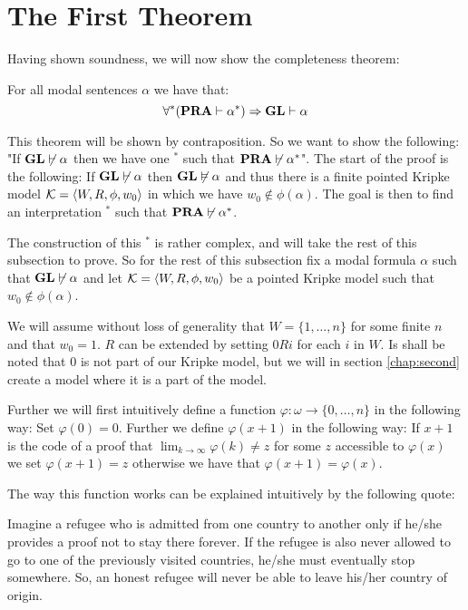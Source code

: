 \documentclass[../main.tex]{subfiles}
\begin{document}
\section{The First Theorem}
Having shown soundness, we will now show the completeness theorem:
\begin{thm}
	For all modal sentences $\alpha$ we have that:
	\[\forall ^* (\text{\textbf{PRA}}\vdash \alpha^*)\Rightarrow \text{\textbf{GL}}\vdash \alpha\]
\end{thm}

This theorem will be shown by contraposition. So we want to show the following:
"If $\text{\textbf{GL}}\not\vdash \alpha$ then we
have one $^*$ such that $\text{\textbf{PRA}}\not\vdash\alpha^*$". 
The start of the proof is the following: If $\text{\textbf{GL}}\not\vdash\alpha$ then
$\text{\textbf{GL}}\not\vDash\alpha$ and thus there is a finite pointed Kripke model $\mathcal{K}=\langle
W,R,\phi,w_0\rangle$ in which we have $w_0\not\in\phi(\alpha)$. The goal is then to
find an interpretation $^*$ such that $\text{\textbf{PRA}}\not\vdash\alpha^*$.

The construction of this
$^*$ is rather complex, and will take the rest of this subsection to prove. So for the
rest of this subsection fix a modal formula $\alpha$ such that $\text{\textbf{GL}}\not\vdash
\alpha$
and let $\mathcal{K}=\langle W,R,\phi,w_0\rangle$ be a pointed Kripke model such that
$w_0\not\in\phi(\alpha)$.

We will assume without loss of generality  that $W=\{1,\ldots, n\}$ for some finite $n$ and that $w_0=1$.
$R$ can be extended by setting $0Ri$ for each $i$ in $W$. Is shall be noted
that $0$ is not part of our Kripke model, but we will in section
\ref{chap:second} create a model where it is a part of the model.

Further we will first intuitively define a function $\varphi:\omega\rightarrow\{0,\ldots, n\}$ in the
following way: Set $\varphi(0)=0$. Further we define $\varphi(x+1)$ in the following way:
If $x+1$ is the code of a proof that $\lim_{k\rightarrow\infty}\varphi(k)\not =z$ for
some $z$ accessible to $\varphi(x)$ we set $\varphi(x+1)=z$ otherwise we have that
$\varphi(x+1)=\varphi(x)$.

The way this function works can be explained intuitively by the following
quote:
\begin{displayquote}
	Imagine a refugee who is admitted from one country to another only if
	he/she provides a proof not to stay there forever. If the refugee is
	also never allowed to go to one of the previously visited countries,
	he/she must eventually stop somewhere. So, an honest refugee will never
	be able to leave his/her country of origin. \parencite{ArteBe}
\end{displayquote}
\end{document}
